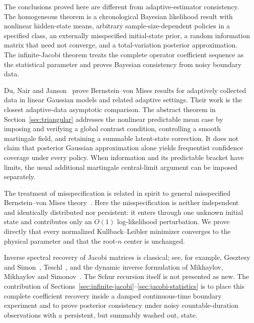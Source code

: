 The conclusions proved here are different from adaptive-estimator consistency.  The homogeneous theorem is a chronological Bayesian likelihood result with nonlinear hidden-state means, arbitrary sample-size-dependent policies in a specified class, an externally misspecified initial-state prior, a random information matrix that need not converge, and a total-variation posterior approximation.  The infinite-Jacobi theorem treats the complete operator coefficient sequence as the statistical parameter and proves Bayesian consistency from noisy boundary data.

Du, Nair and Janson~\cite{DuNairJanson2025} prove Bernstein--von Mises results for adaptively collected data in linear Gaussian models and related adaptive settings.  Their work is the closest adaptive-data asymptotic comparison.  The abstract theorem in Section~\ref{sec:triangular} addresses the nonlinear predictable mean case by imposing and verifying a global contrast condition, controlling a smooth martingale field, and retaining a summable latent-state correction.  It does not claim that posterior Gaussian approximation alone yields frequentist confidence coverage under every policy.  When information and its predictable bracket have limits, the usual additional martingale central-limit argument can be imposed separately.

The treatment of misspecification is related in spirit to general misspecified Bernstein--von Mises theory~\cite{KleijnVanDerVaart2012}.  Here the misspecification is neither independent and identically distributed nor persistent: it enters through one unknown initial state and contributes only an \(O(1)\) log-likelihood perturbation.  We prove directly that every normalized Kullback--Leibler minimizer converges to the physical parameter and that the root-\(n\) center is unchanged.

Inverse spectral recovery of Jacobi matrices is classical; see, for example, Gesztesy and Simon~\cite{GesztesySimon1997}, Teschl~\cite{Teschl2000}, and the dynamic inverse formulation of Mikhaylov, Mikhaylov and Simonov~\cite{Mikhaylov2019}.  The Schur recursion itself is not presented as new.  The contribution of Sections~\ref{sec:infinite-jacobi}--\ref{sec:jacobi-statistics} is to place this complete coefficient recovery inside a damped continuous-time boundary experiment and to prove posterior consistency under noisy countable-duration observations with a persistent, but summably washed out, state.

